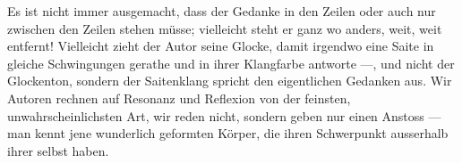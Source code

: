 Es ist nicht immer ausgemacht, dass der Gedanke in den Zeilen oder auch nur zwischen den Zeilen stehen müsse; vielleicht steht er ganz wo anders, weit, weit entfernt! Vielleicht zieht der Autor seine Glocke, damit irgendwo eine Saite in gleiche Schwingungen gerathe und in ihrer Klangfarbe antworte —, und nicht der Glockenton, sondern der Saitenklang spricht den eigentlichen Gedanken aus. Wir Autoren rechnen auf Resonanz und Reflexion von der feinsten, unwahrscheinlichsten Art, wir reden nicht, sondern geben nur einen Anstoss — man kennt jene wunderlich geformten Körper, die ihren Schwerpunkt ausserhalb ihrer selbst haben.
\par

